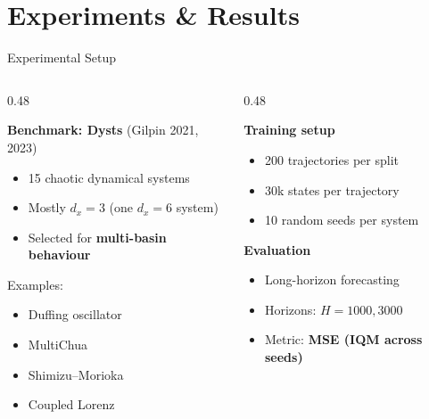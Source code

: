 \documentclass[aspectratio=169, 10pt]{beamer}
\begin{document}
\section{Experiments \& Results}
\begin{frame}{Experimental Setup}

\begin{columns}

\begin{column}{0.48\textwidth}

\textbf{Benchmark: Dysts} (Gilpin 2021, 2023)

\begin{itemize}
\item 15 chaotic dynamical systems
\item Mostly $d_x = 3$ (one $d_x = 6$ system)
\item Selected for \textbf{multi-basin behaviour}
\end{itemize}

\vspace{0.5em}

Examples:
\begin{itemize}
\item Duffing oscillator
\item MultiChua
\item Shimizu–Morioka
\item Coupled Lorenz
\end{itemize}

\end{column}

\begin{column}{0.48\textwidth}

\textbf{Training setup}

\begin{itemize}
\item 200 trajectories per split
\item 30k states per trajectory
\item 10 random seeds per system
\end{itemize}

\vspace{0.5em}

\textbf{Evaluation}

\begin{itemize}
\item Long-horizon forecasting
\item Horizons: $H = 1000, 3000$
\item Metric: \textbf{MSE (IQM across seeds)}
\end{itemize}

\end{column}

\end{columns}

\vspace{0.5em}


\end{frame}
\end{document}
